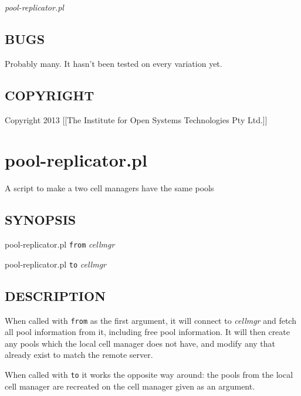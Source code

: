 \documentclass{article}
\begin{document}
\emph{pool-replicator.pl}

\subsection*{BUGS\label{device-replicator_pl_BUGS}}


Probably many. It hasn't been tested on every variation yet.

\subsection*{COPYRIGHT\label{device-replicator_pl_COPYRIGHT}}


Copyright 2013 [[The Institute for Open Systems Technologies Pty Ltd.]]

\clearpage
\section{pool-replicator.pl\label{pool-replicator_pl}}


A script to make a two cell managers have the same pools

\subsection*{SYNOPSIS\label{pool-replicator_pl_SYNOPSIS}}


pool-replicator.pl \texttt{from} \textit{cellmgr}



pool-replicator.pl \texttt{to} \textit{cellmgr}

\subsection*{DESCRIPTION\label{pool-replicator_pl_DESCRIPTION}}


When called with \texttt{from} as the first argument, it will connect to
\textit{cellmgr} and fetch all pool information from it, including free pool
information. It will then create any pools which the local cell manager
does not have, and modify any that already exist to match the remote server.



When called with \texttt{to} it works the opposite way around: the pools
from the local cell manager are recreated on the cell manager given as an argument.
\end{document}
